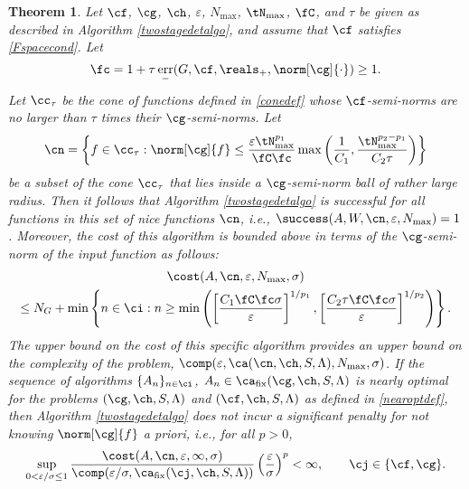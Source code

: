 \documentclass[final]{elsarticle}
\DeclareMathOperator{\err}{err}
\newtheorem{theorem}{Theorem}
\theoremstyle{definition}
\theoremstyle{remark}
\DeclareMathOperator{\fix}{fix}
\begin{document}
\begin{theorem}  \label{TwoStageDetermThm}  Let  $\cf$, $\cg$, $\ch$, $\varepsilon$, $N_{\max}$, $\tN_{\max}$, $\fC$, and $\tau$ be given as described in Algorithm \ref{twostagedetalgo}, and assume that $\cf$ satisfies \eqref{Fspacecond}.  Let 
\begin{equation} \label{normdeflate}
\fc =1 + \tau \err_{-}(G,\cf,\reals_+,\norm[\cg]{\cdot})  \ge 1.
\end{equation}
Let $\cc_\tau$ be the cone of functions defined in \eqref{conedef} whose $\cf$-semi-norms are no larger than $\tau$ times their $\cg$-semi-norms.  Let
\begin{equation} \label{nicefdef}
\cn = \left \{ f \in \cc_\tau : \norm[\cg]{f} \le \frac{\varepsilon \tN_{\max}^{p_1}}{\fC \fc} \max\left( \frac{1}{C_1}, \frac{\tN_{\max}^{p_2-p_1}}{C_2 \tau} \right ) \right\}
\end{equation}
be a subset of the cone $\cc_\tau$ that lies inside a $\cg$-semi-norm ball of rather large radius.  Then it follows that Algorithm \ref{twostagedetalgo} is successful for all functions in this set of \emph{nice} functions $\cn$,  i.e.,  $\success(A,W,\cn,\varepsilon,N_{\max}) = 1$.  Moreover, the cost of this algorithm is bounded above in terms of the $\cg$-semi-norm of the input function as follows:
\begin{multline} \label{auto2stagedetcost}
\cost(A,\cn,\varepsilon,N_{\max},\sigma) \\
\le N_G+ \min\left\{ n \in \ci : n \ge \min\left( \left[\frac{C_1 \fC \fc \sigma }{\varepsilon}\right]^{1/p_1}, \left[\frac{C_2 \tau \fC \fc \sigma}{\varepsilon}\right]^{1/p_2} \right ) \right\}.
\end{multline}
The upper bound on the cost of this specific algorithm provides an upper bound on the complexity of the problem, $\comp(\varepsilon,\ca(\cn,\ch,S,\Lambda),N_{\max},\sigma)$.  If the sequence of algorithms $\{A_n\}_{n \in \ci}$, $A_n \in\ca_{\fix}(\cg,\ch,S,\Lambda)$  is nearly optimal for the problems $(\cg,\ch,S,\Lambda)$ and $(\cf,\ch,S,\Lambda)$ as defined in \eqref{nearoptdef}, then Algorithm \ref{twostagedetalgo} does not incur a significant penalty for not knowing $\norm[\cg]{f}$ a priori, i.e., for all $p>0$,
\begin{equation} \label{penalty}
\sup_{0 < \varepsilon/\sigma \le 1} \frac{\cost(A,\cn,\varepsilon,\infty,\sigma)} {\comp(\varepsilon/\sigma,\ca_{\fix}(\cj,\ch,S,\Lambda))} \left(\frac{\varepsilon}{\sigma}\right)^p <\infty, \qquad \cj \in \{\cf,\cg\}.
\end{equation}
\end{theorem}
\end{document}

